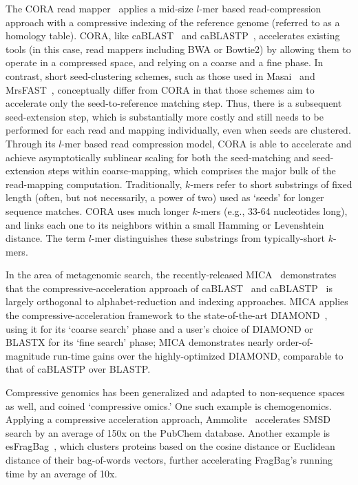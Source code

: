 \documentclass{acm_proc_article-sp}
\begin{document}
The CORA read mapper~\cite{yorukoglu2015compressive} applies a mid-size $l$-mer based 
read-compression approach with a compressive indexing of the reference genome
(referred to as a homology table).
CORA, like caBLAST~\cite{loh2012compressive} and 
caBLASTP~\cite{daniels2013comprssive}, accelerates existing tools (in this 
case, read
mappers including BWA or Bowtie2) by allowing them to operate in a compressed
space, and relying on a coarse and a fine phase.
In contrast, short seed-clustering schemes, such as those used in Masai~\cite{siragusa2013fast} and 
MrsFAST~\cite{berger2013computational}, conceptually differ from CORA in that those 
schemes aim to accelerate only the seed-to-reference matching step.
Thus, there is a subsequent seed-extension step, which is substantially more 
costly and still needs to be performed for each read and mapping individually, 
even when seeds are clustered. 
Through its $l$-mer based read compression model, CORA is able to accelerate 
and 
achieve asymptotically sublinear scaling for both the seed-matching and 
seed-extension steps within coarse-mapping, which comprises the major bulk of 
the read-mapping computation.
Traditionally, $k$-mers refer to short substrings of fixed length (often, but 
not necessarily, a power of two) used as `seeds' for longer sequence matches.
CORA uses much longer $k$-mers (e.g., 33-64 nucleotides long), and links each 
one to its neighbors within a small Hamming or Levenshtein distance.
The term $l$-mer distinguishes these substrings from typically-short $k$-mers.

In the area of metagenomic search,
the recently-released MICA~\cite{yu2015entropy} demonstrates that the 
compressive-acceleration approach of 
caBLAST~\cite{loh2012compressive} and caBLASTP~\cite{daniels2013compressive} is 
largely orthogonal to alphabet-reduction and indexing approaches.
MICA applies the compressive-acceleration framework to the
state-of-the-art DIAMOND~\cite{buchfink2014fast}, using it
for its `coarse search' phase and a user's choice of DIAMOND or BLASTX for its
`fine search' phase; MICA demonstrates nearly order-of-magnitude run-time gains over the highly-optimized DIAMOND, comparable to that of caBLASTP over BLASTP.

Compressive genomics \cite{loh2012compressive} has been
generalized and adapted to non-sequence spaces as well, and coined
`compressive omics.'
One such example is chemogenomics.
Applying a compressive acceleration approach, Ammolite~\cite{yu2015entropy}
accelerates SMSD search by an average of 150x on the PubChem database.
Another example is 
esFragBag~\cite{yu2015entropy}, which clusters proteins based on the cosine distance or
Euclidean distance of their bag-of-words vectors, further accelerating FragBag's
running time by an average of 10x.
\end{document}
